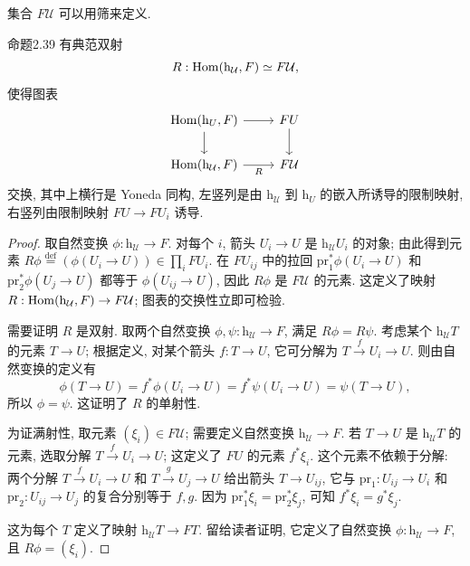 集合 $F\mathcal U$ 可以用筛来定义.

\begin{origstatement}{命题}{2.39}\label{ch02:prop239}
有典范双射
\[
R:\operatorname{Hom}(\mathrm h_{\mathcal U},F)\simeq F\mathcal U,
\]
使得图表
\[
\begin{tikzcd}
\Hom(\mathrm h_U,F)\arrow[r]\arrow[d]&FU\arrow[d]\\
\Hom(\mathrm h_{\mathcal U},F)\arrow[r,"R"']&F\mathcal U
\end{tikzcd}
\]
交换, 其中上横行是 Yoneda 同构, 左竖列是由 $\mathrm h_{\mathcal U}$ 到 $\mathrm h_U$ 的嵌入所诱导的限制映射, 右竖列由限制映射 $FU\to FU_i$ 诱导.
\end{origstatement}
\begin{proof}
取自然变换 $\phi:\mathrm h_{\mathcal U}\to F$. 对每个 $i$, 箭头 $U_i\to U$ 是 $\mathrm h_{\mathcal U}U_i$ 的对象; 由此得到元素 $R\phi\overset{\mathrm{def}}=(\phi(U_i\to U))\in\prod_iFU_i$. 在 $FU_{ij}$ 中的拉回 $\mathrm{pr}_1^*\phi(U_i\to U)$ 和 $\mathrm{pr}_2^*\phi(U_j\to U)$ 都等于 $\phi(U_{ij}\to U)$, 因此 $R\phi$ 是 $F\mathcal U$ 的元素. 这定义了映射 $R:\operatorname{Hom}(\mathrm h_{\mathcal U},F)\to F\mathcal U$; 图表的交换性立即可检验.

需要证明 $R$ 是双射. 取两个自然变换 $\phi,\psi:\mathrm h_{\mathcal U}\to F$, 满足 $R\phi=R\psi$. 考虑某个 $\mathrm h_{\mathcal U}T$ 的元素 $T\to U$; 根据定义, 对某个箭头 $f:T\to U$, 它可分解为 $T\xrightarrow fU_i\to U$. 则由自然变换的定义有
\[
\phi(T\to U)=f^*\phi(U_i\to U)=f^*\psi(U_i\to U)=\psi(T\to U),
\]
所以 $\phi=\psi$. 这证明了 $R$ 的单射性.

为证满射性, 取元素 $(\xi_i)\in F\mathcal U$; 需要定义自然变换 $\mathrm h_{\mathcal U}\to F$. 若 $T\to U$ 是 $\mathrm h_{\mathcal U}T$ 的元素, 选取分解 $T\xrightarrow fU_i\to U$; 这定义了 $FU$ 的元素 $f^*\xi_i$.
这个元素不依赖于分解: 两个分解 $T\xrightarrow fU_i\to U$ 和 $T\xrightarrow gU_j\to U$ 给出箭头 $T\to U_{ij}$, 它与 $\mathrm{pr}_1:U_{ij}\to U_i$ 和 $\mathrm{pr}_2:U_{ij}\to U_j$ 的复合分别等于 $f,g$. 因为 $\mathrm{pr}_1^*\xi_i=\mathrm{pr}_2^*\xi_j$, 可知 $f^*\xi_i=g^*\xi_j$.

这为每个 $T$ 定义了映射 $\mathrm h_{\mathcal U}T\to FT$. 留给读者证明, 它定义了自然变换 $\phi:\mathrm h_{\mathcal U}\to F$, 且 $R\phi=(\xi_i)$.
\end{proof}

